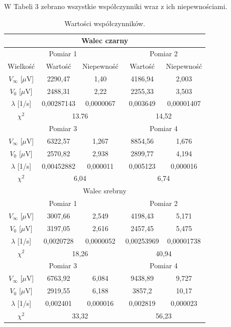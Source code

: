 \documentclass[10pt,a4paper]{article}
\begin{document}
W Tabeli 3 zebrano wszystkie współczynniki wraz z ich niepewnościami.

\begin{table}[h!]
\centering
\caption{Wartości współczynników.}

\begin{tabular}{|c|c|c|c|c|}
\hline
\multicolumn{5}{|c|}{Walec czarny}                                     \\ \hline
\multicolumn{3}{|c|}{Pomiar 1}         & \multicolumn{2}{c|}{Pomiar 2} \\ \hline
Wielkość     & Wartość    & Niepewność & Wartość       & Niepewność    \\ \hline
$V_{\infty}$ [$\mu$V]& 2290,47    & 1,40       & 4186,94       & 2,003         \\ \hline
$V_{0}$ [$\mu$V]      & 2488,31    & 2,22       & 2255,33       & 3,503         \\ \hline
$\lambda$ [1/s]    & 0,00287143 & 0,0000067  & 0,003649      & 0,00001407    \\ \hline
$\chi^2$&\multicolumn{2}{c|}{13.76}	&	\multicolumn{2}{c|}{14,52}	 \\ \hline
\multicolumn{3}{|c|}{Pomiar 3}         & \multicolumn{2}{c|}{Pomiar 4} \\ \hline
$V_{\infty}$ [$\mu$V] & 6322,57    & 1,267      & 8854,56       & 1,676         \\ \hline
$V_{0}$ [$\mu$V]      & 2570,82    & 2,938      & 2899,77       & 4,194         \\ \hline
$\lambda$ [1/s]   & 0,00452882 & 0,000011   & 0,005123      & 0,000016      \\ \hline
$\chi^2$&\multicolumn{2}{c|}{6,04}	&	\multicolumn{2}{c|}{6,74}	 \\ \hline
\multicolumn{5}{|c|}{Walec srebrny}                                    \\ \hline
\multicolumn{3}{|c|}{Pomiar 1}         & \multicolumn{2}{c|}{Pomiar 2} \\ \hline
$V_{\infty}$ [$\mu$V] & 3007,66    & 2,549      & 4198,43       & 5,171         \\ \hline
$V_{0}$ [$\mu$V]      & 3197,05    & 2,616      & 2457,45       & 5,475         \\ \hline
$\lambda$  [1/s]  & 0,0020728  & 0,0000052  & 0,00253969    & 0,00001738    \\ \hline
$\chi^2$&\multicolumn{2}{c|}{18,26}	&	\multicolumn{2}{c|}{40,94}	 \\ \hline
\multicolumn{3}{|c|}{Pomiar 3}         & \multicolumn{2}{c|}{Pomiar 4} \\ \hline
$V_{\infty}$ [$\mu$V]& 6763,92  & 6,084    & 9438,89       & 9,727         \\ \hline
$V_{0}$ [$\mu$V]      & 2919,55  & 6,188    & 3857,2        & 10,17         \\ \hline
$\lambda$ [1/s]   & 0,002401 & 0,000016 & 0,002819      & 0,000023      \\ \hline
$\chi^2$&\multicolumn{2}{c|}{33,32}	&	\multicolumn{2}{c|}{56,23}	 \\ \hline
\end{tabular}
\end{table}
\end{document}
